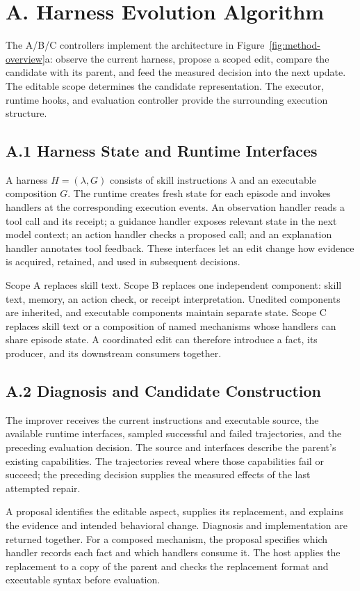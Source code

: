 \section*{A. Harness Evolution Algorithm}
\label{app:algorithm}
The A/B/C controllers implement the architecture in Figure~\ref{fig:method-overview}a: observe the current harness, propose a scoped edit, compare the candidate with its parent, and feed the measured decision into the next update. The editable scope determines the candidate representation. The executor, runtime hooks, and evaluation controller provide the surrounding execution structure.

\subsection*{A.1 Harness State and Runtime Interfaces}
A harness $H=(\lambda,G)$ consists of skill instructions $\lambda$ and an executable composition $G$. The runtime creates fresh state for each episode and invokes handlers at the corresponding execution events. An observation handler reads a tool call and its receipt; a guidance handler exposes relevant state in the next model context; an action handler checks a proposed call; and an explanation handler annotates tool feedback. These interfaces let an edit change how evidence is acquired, retained, and used in subsequent decisions.

Scope A replaces skill text. Scope B replaces one independent component: skill text, memory, an action check, or receipt interpretation. Unedited components are inherited, and executable components maintain separate state. Scope C replaces skill text or a composition of named mechanisms whose handlers can share episode state. A coordinated edit can therefore introduce a fact, its producer, and its downstream consumers together.

\subsection*{A.2 Diagnosis and Candidate Construction}
The improver receives the current instructions and executable source, the available runtime interfaces, sampled successful and failed trajectories, and the preceding evaluation decision. The source and interfaces describe the parent's existing capabilities. The trajectories reveal where those capabilities fail or succeed; the preceding decision supplies the measured effects of the last attempted repair.

A proposal identifies the editable aspect, supplies its replacement, and explains the evidence and intended behavioral change. Diagnosis and implementation are returned together. For a composed mechanism, the proposal specifies which handler records each fact and which handlers consume it. The host applies the replacement to a copy of the parent and checks the replacement format and executable syntax before evaluation.

